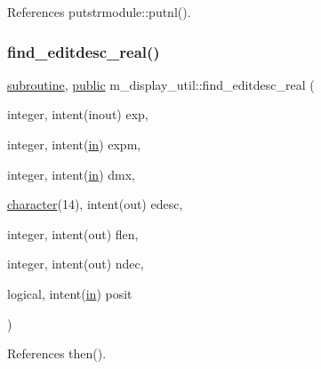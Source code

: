 References putstrmodule\+::putnl().

\mbox{\label{namespacem__display__util_abcd2aebb4cd373005b4d1fc4359a2d01}} 
\subsubsection{\texorpdfstring{find\+\_\+editdesc\+\_\+real()}{find\_editdesc\_real()}}
{\footnotesize\ttfamily \hyperlink{M__stopwatch_83_8txt_acfbcff50169d691ff02d4a123ed70482}{subroutine}, \hyperlink{M__stopwatch_83_8txt_a2f74811300c361e53b430611a7d1769f}{public} m\+\_\+display\+\_\+util\+::find\+\_\+editdesc\+\_\+real (\begin{DoxyParamCaption}\item[{integer, intent(inout)}]{exp,  }\item[{integer, intent(\hyperlink{M__journal_83_8txt_afce72651d1eed785a2132bee863b2f38}{in})}]{expm,  }\item[{integer, intent(\hyperlink{M__journal_83_8txt_afce72651d1eed785a2132bee863b2f38}{in})}]{dmx,  }\item[{\hyperlink{option__stopwatch_83_8txt_abd4b21fbbd175834027b5224bfe97e66}{character}(14), intent(out)}]{edesc,  }\item[{integer, intent(out)}]{flen,  }\item[{integer, intent(out)}]{ndec,  }\item[{logical, intent(\hyperlink{M__journal_83_8txt_afce72651d1eed785a2132bee863b2f38}{in})}]{posit }\end{DoxyParamCaption})}



References then().

\mbox{\label{namespacem__display__util_a056732cc150994b9abe25ed0d72ebee4}} 
